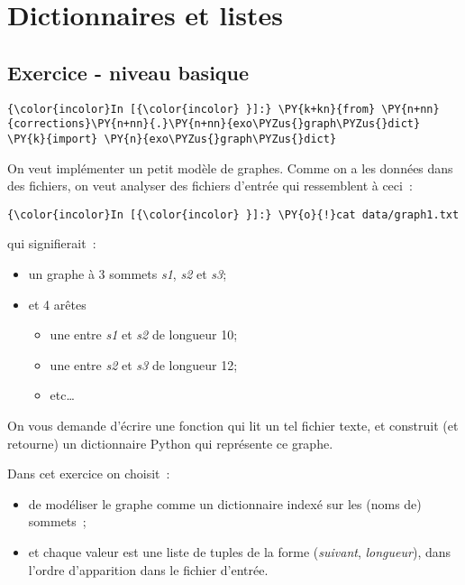     \hypertarget{dictionnaires-et-listes}{%
\section{Dictionnaires et listes}\label{dictionnaires-et-listes}}

    \hypertarget{exercice---niveau-basique}{%
\subsection{Exercice - niveau basique}\label{exercice---niveau-basique}}

    \begin{Verbatim}[commandchars=\\\{\}]
{\color{incolor}In [{\color{incolor} }]:} \PY{k+kn}{from} \PY{n+nn}{corrections}\PY{n+nn}{.}\PY{n+nn}{exo\PYZus{}graph\PYZus{}dict} \PY{k}{import} \PY{n}{exo\PYZus{}graph\PYZus{}dict}
\end{Verbatim}


    On veut implémenter un petit modèle de graphes. Comme on a les données
dans des fichiers, on veut analyser des fichiers d'entrée qui
ressemblent à ceci~:

    \begin{Verbatim}[commandchars=\\\{\}]
{\color{incolor}In [{\color{incolor} }]:} \PY{o}{!}cat data/graph1.txt
\end{Verbatim}


    qui signifierait~:
    
\begin{itemize}
	\item 
	un graphe à 3 sommets \emph{s1}, \emph{s2} et \emph{s3};
	\item
	et 4 arêtes
	\begin{itemize}
		\item 
		une entre \emph{s1} et \emph{s2} de longueur 10;
		\item
		une entre \emph{s2} et \emph{s3} de longueur 12;
		\item
		etc\ldots{}
	\end{itemize}
\end{itemize}

    On vous demande d'écrire une fonction qui lit un tel fichier texte, et
construit (et retourne) un dictionnaire Python qui représente ce graphe.

Dans cet exercice on choisit~:

\begin{itemize}
	\item
	de modéliser le graphe comme un dictionnaire indexé sur les (noms de) sommets~;
	\item
	et chaque valeur est une liste de tuples de la forme (\emph{suivant}, \emph{longueur}), dans
	l'ordre d'apparition dans le fichier d'entrée.
\end{itemize}

